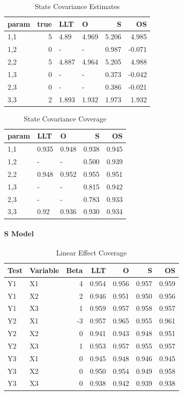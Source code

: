\documentclass[
]{article}
\begin{document}
\begin{longtable}[t]{l|r|l|l|r|r}
\caption{\label{tab:unnamed-chunk-12}State Covariance Estimates}\\
\hline
param & true & LLT & O & S & OS\\
\hline
1,1 & 5 & 4.89 & 4.969 & 5.206 & 4.985\\
\hline
1,2 & 0 & - & - & 0.987 & -0.071\\
\hline
2,2 & 5 & 4.887 & 4.964 & 5.205 & 4.988\\
\hline
1,3 & 0 & - & - & 0.373 & -0.042\\
\hline
2,3 & 0 & - & - & 0.386 & -0.021\\
\hline
3,3 & 2 & 1.893 & 1.932 & 1.973 & 1.932\\
\hline
\end{longtable}

\begin{longtable}[t]{l|l|l|r|r}
\caption{\label{tab:unnamed-chunk-13}State Covariance Coverage}\\
\hline
param & LLT & O & S & OS\\
\hline
1,1 & 0.935 & 0.948 & 0.938 & 0.945\\
\hline
1,2 & - & - & 0.500 & 0.939\\
\hline
2,2 & 0.948 & 0.952 & 0.955 & 0.951\\
\hline
1,3 & - & - & 0.815 & 0.942\\
\hline
2,3 & - & - & 0.783 & 0.933\\
\hline
3,3 & 0.92 & 0.936 & 0.930 & 0.934\\
\hline
\end{longtable}

\hypertarget{s-model-1}{%
\paragraph{S Model}\label{s-model-1}}

\begin{longtable}[t]{l|l|r|r|r|r|r}
\caption{\label{tab:unnamed-chunk-14}Linear Effect Coverage}\\
\hline
Test & Variable & Beta & LLT & O & S & OS\\
\hline
Y1 & X1 & 4 & 0.954 & 0.956 & 0.957 & 0.959\\
\hline
Y1 & X2 & 2 & 0.946 & 0.951 & 0.950 & 0.956\\
\hline
Y1 & X3 & 1 & 0.959 & 0.957 & 0.958 & 0.957\\
\hline
Y2 & X1 & -3 & 0.957 & 0.965 & 0.955 & 0.961\\
\hline
Y2 & X2 & 0 & 0.941 & 0.943 & 0.948 & 0.951\\
\hline
Y2 & X3 & 1 & 0.953 & 0.957 & 0.955 & 0.957\\
\hline
Y3 & X1 & 0 & 0.945 & 0.948 & 0.946 & 0.945\\
\hline
Y3 & X2 & 0 & 0.950 & 0.954 & 0.949 & 0.958\\
\hline
Y3 & X3 & 0 & 0.938 & 0.942 & 0.939 & 0.938\\
\hline
\end{longtable}
\end{document}

